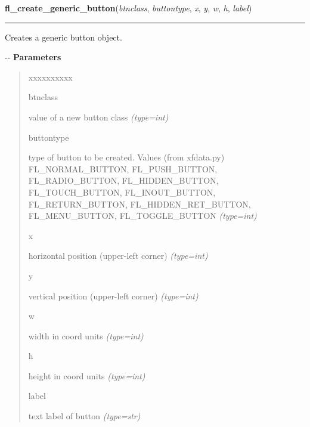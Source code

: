 \hspace{.8\funcindent}\begin{boxedminipage}{\funcwidth}

    \raggedright \textbf{fl\_create\_generic\_button}(\textit{btnclass}, \textit{buttontype}, \textit{x}, \textit{y}, \textit{w}, \textit{h}, \textit{label})

    \vspace{-1.5ex}

    \rule{\textwidth}{0.5\fboxrule}
\setlength{\parskip}{2ex}

Creates a generic button object.

-{}-
\setlength{\parskip}{1ex}
      \textbf{Parameters}
      \vspace{-1ex}

      \begin{quote}
        \begin{Ventry}{xxxxxxxxxx}

          \item[btnclass]


value of a new button class
            {\it (type=int)}

          \item[buttontype]


type of button to be created. Values (from xfdata.py) FL\_NORMAL\_BUTTON,
FL\_PUSH\_BUTTON, FL\_RADIO\_BUTTON, FL\_HIDDEN\_BUTTON, FL\_TOUCH\_BUTTON,
FL\_INOUT\_BUTTON, FL\_RETURN\_BUTTON, FL\_HIDDEN\_RET\_BUTTON,
FL\_MENU\_BUTTON, FL\_TOGGLE\_BUTTON
            {\it (type=int)}

          \item[x]


horizontal position (upper-left corner)
            {\it (type=int)}

          \item[y]


vertical position (upper-left corner)
            {\it (type=int)}

          \item[w]


width in coord units
            {\it (type=int)}

          \item[h]


height in coord units
            {\it (type=int)}

          \item[label]


text label of button
            {\it (type=str)}


\end{Ventry}
\end{quote}
\end{boxedminipage}
